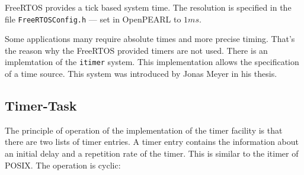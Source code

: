 FreeRTOS provides a tick based system time. The resolution is specified
in the file \texttt{FreeRTOSConfig.h} --- 
set in OpenPEARL to $1 ms$.

Some applications many require absolute times and more precise timing.
That's the reason why the FreeRTOS provided timers are not used. 
There is an implemtation of the \texttt{itimer} system. This 
implementation allows the specification of a time source.
This system was introduced  by Jonas Meyer in his thesis.

\subsection{Timer-Task}
The principle of operation of the implementation of the timer facility is
that there are two lists of timer entries. A timer entry contains 
the information about an initial delay and a repetition rate of the timer.
This is similar to the itimer of POSIX.
The operation is cyclic:
